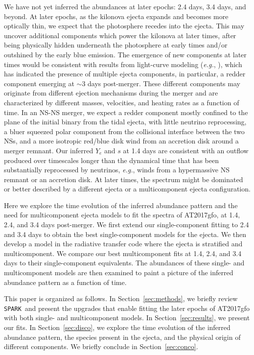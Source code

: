 \documentclass[twocolumn,twocolappendix]{aastex63}
\def\SPARK{\texttt{SPARK}}
\def\eg{{\it e.g.}}
\begin{document}
We have not yet inferred the abundances at later epochs: 2.4 days, 3.4 days, and beyond. At later epochs, as the kilonova ejecta expands and becomes more optically thin, we expect that the photosphere recedes into the ejecta. This may uncover additional components which power the kilonova at later times, after being physically hidden underneath the photosphere at early times and/or outshined by the early blue emission. The emergence of new components at later times would be consistent with results from light-curve modeling (\eg, \citealt{villar17}), which has indicated the presence of multiple ejecta components, in particular, a redder component emerging at $\sim$3 days post-merger. These different components may originate from different ejection mechanisms during the merger and are characterized by different masses, velocities, and heating rates as a function of time. In an NS-NS merger, we expect a redder component mostly confined to the plane of the initial binary from the tidal ejecta, with little neutrino reprocessing, a bluer squeezed polar component from the collisional interface between the two NSs, and a more isotropic red/blue disk wind from an accretion disk around a merger remnant. Our inferred $Y_e$ and $s$ at 1.4 days are consistent with an outflow produced over timescales longer than the dynamical time that has been substantially reprocessed by neutrinos, \eg, winds from a hypermassive NS remnant or an accretion disk. At later times, the spectrum might be dominated or better described by a different ejecta or a multicomponent ejecta configuration. 

Here we explore the time evolution of the inferred abundance pattern and the need for multicomponent ejecta models to fit the spectra of AT2017gfo, at 1.4, 2.4, and 3.4 days post-merger. We first extend our single-component fitting to 2.4 and 3.4 days to obtain the best single-component models for the ejecta. We then develop a model in the radiative transfer code where the ejecta is stratified and multicomponent. We compare our best multicomponent fits at 1.4, 2.4, and 3.4 days to their single-component equivalents. The abundances of these single- and multicomponent models are then examined to paint a picture of the inferred abundance pattern as a function of time. 

This paper is organized as follows. In Section~\ref{sec:methods}, we briefly review \SPARK~and present the upgrades that enable fitting the later epochs of AT2017gfo with both single- and multicomponent models. In Section~\ref{sec:results}, we present our fits. In Section~\ref{sec:disco}, we explore the time evolution of the inferred abundance pattern, the species present in the ejecta, and the physical origin of different components. We briefly conclude in Section~\ref{sec:conco}.
\end{document}

